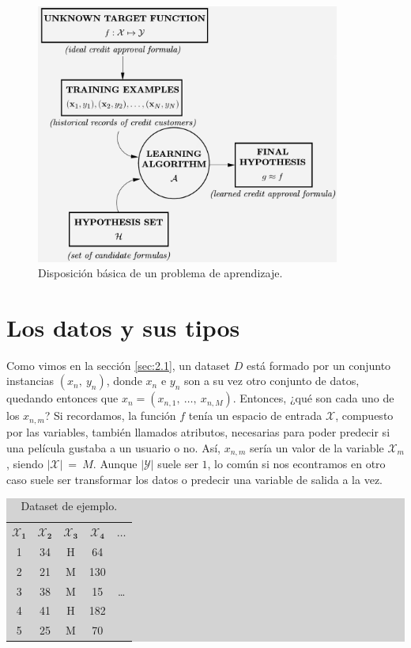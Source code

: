 \begin{figure}[ht]
  \centering
  \includegraphics[width=100mm]{figures/ch_02/the_learning_problem.png}
  \caption{Disposición básica de un problema de aprendizaje. \cite{abu2012learning}}
  \label{fig:2.1}
\end{figure}

\section{Los datos y sus tipos} \label{sec:2.2}

Como vimos en la sección \ref{sec:2.1}, un dataset $D$ está formado por un conjunto instancias $(x_{n},\:y_{n})$, donde $x_{n}$ e $y_{n}$ son a su vez otro conjunto de datos, quedando entonces que $x_{n} = (x_{n,1},\:\dots,\:x_{n,M})$. Entonces, ¿qué son cada uno de los $x_{n,m}$? Si recordamos, la función $f$ tenía un espacio de entrada $\mathcal{X}$, compuesto por las variables, también llamados atributos, necesarias para poder predecir si una película gustaba a un usuario o no. Así, $x_{n,m}$ sería un valor de la variable $\mathcal{X}_{m}$, siendo $|\mathcal{X}|\:=\:M$. Aunque $|\mathcal{Y}|$ suele ser $1$, lo común si nos econtramos en otro caso suele ser transformar los datos o predecir una variable de salida a la vez.

\begin{table}[ht]
\centering
\colorbox{lightgray}{\begin{tabular}{*{5}{c}}
  $\mathbf{\mathcal{X}_{1}}$ & $\mathbf{\mathcal{X}_{2}}$ & $\mathbf{\mathcal{X}_{3}}$ & $\mathbf{\mathcal{X}_{4}}$ & $\mathbf{\dots}$ \\
  1 & 34 & H & 64 & \\
  2 & 21 & M & 130 & \\
  3 & 38 & M & 15 & \dots \\
  4 & 41 & H & 182 & \\
  5 & 25 & M & 70 & 
\end{tabular}}
\caption{Dataset de ejemplo.}
\label{table:2.1}
\end{table}

